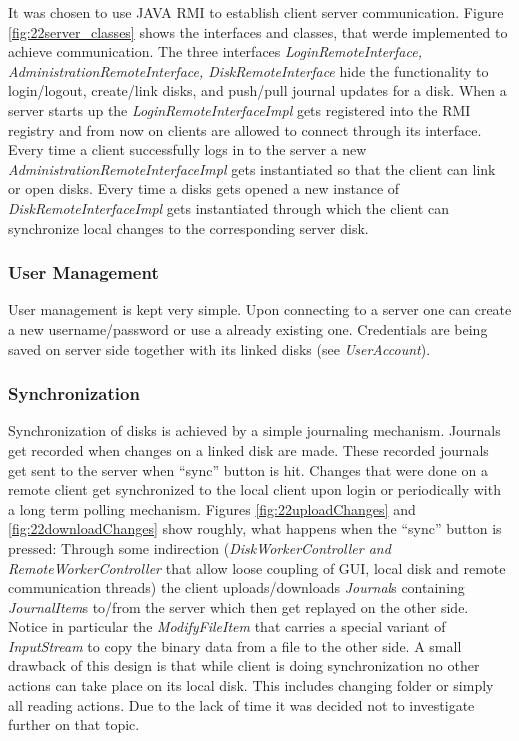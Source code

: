 It was chosen to use JAVA RMI to establish client server
communication. Figure \ref{fig:22server_classes} shows the interfaces and
classes, that werde implemented to achieve communication. The three interfaces
\textit{LoginRemoteInterface, AdministrationRemoteInterface,
DiskRemoteInterface} hide the functionality to login/logout, create/link disks,
and push/pull journal updates for a disk. When a server starts up the
\textit{LoginRemoteInterfaceImpl} gets registered into the RMI registry and from
now on clients are allowed to connect through its interface. Every time a
client successfully logs in to the server a new
\textit{AdministrationRemoteInterfaceImpl} gets instantiated so that the client can link or open disks. Every time a disks
gets opened a new instance of \textit{DiskRemoteInterfaceImpl} gets
instantiated through which the client can synchronize local changes to the
corresponding server disk.


\subsubsection{User Management}
User management is kept very simple. Upon connecting to a server one can
create a new username/password or use a already existing one. Credentials are
being saved on server side together with its linked disks (see
\textit{UserAccount}).

\subsubsection{Synchronization}
Synchronization of disks is achieved by a simple journaling mechanism. Journals
get recorded when changes on a linked disk are made. These recorded journals get
sent to the server when ``sync'' button is hit. Changes that were done on a
remote client get synchronized to the local client upon login or periodically
with a long term polling mechanism. Figures \ref{fig:22uploadChanges} and
\ref{fig:22downloadChanges} show roughly, what happens when the ``sync'' button
is pressed: Through some indirection (\textit{DiskWorkerController and
RemoteWorkerController} that allow loose coupling of GUI, local disk and remote
communication threads) the client uploads/downloads \textit{Journal}s containing
\textit{JournalItem}s to/from the server which then get replayed on the other
side. Notice in particular the \textit{ModifyFileItem} that carries a special
variant of \textit{InputStream} to copy the binary data from a file to the other
side. A small drawback of this design is that while client is doing
synchronization no other actions can take place on its local disk. This includes
changing folder or simply all reading actions. Due to the lack of time it was
decided not to investigate further on that topic.

